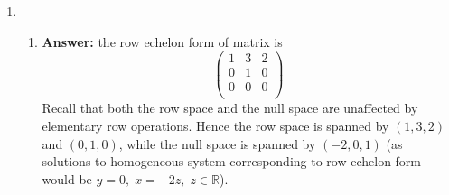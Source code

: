 \documentclass[8pt]{article} %
\begin{document}
\begin{enumerate}[1]
	\item \begin{enumerate}[\bf(a)]
	\item {\bf Answer: }the row echelon form of matrix is
			\[\left(\begin{array}{rrr}
			1&3&2\\
			0&1&0\\
			0&0&0\\
			\end{array}\right)
			\]
			Recall that both the row space and the null space are unaffected by elementary row operations.
			Hence the row space is spanned by $(1,3,2)$ and $(0,1,0)$, while the null space is spanned by $(-2,0,1)$ (as solutions
			to homogeneous system corresponding to row echelon form would be $y=0,\;x=-2z,\;z\in\mathbb{R}$). 
			

\end{enumerate}
\end{enumerate}
\end{document}
